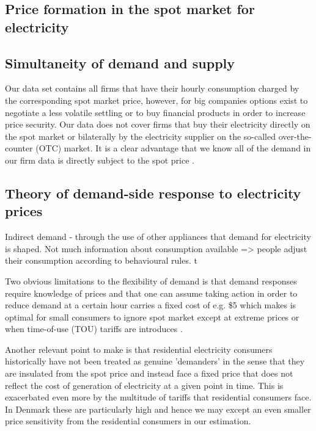 \label{sec:theory}
\subsection{Price formation in the spot market for electricity}
\label{subsec:t_price}


\subsection{Simultaneity of demand and supply}
\label{subsec:t_simultaneity}
Our data set contains all firms that have their hourly consumption charged by the corresponding spot market price, however, for big companies options exist to negotiate a less volatile settling or to buy financial products in order to increase price security. Our data does not cover firms that buy their electricity directly on the spot market or bilaterally by the electricity supplier on the so-called over-the-counter (OTC) market. It is a clear advantage that we know all of the demand in our firm data is directly subject to the spot price \citep{lijesen2007real}.


\subsection{Theory of demand-side response to electricity prices}
\label{subsec:t_demand}
Indirect demand - through the use of other appliances that demand for electricity is shaped. Not much information about consumption available => people adjust their consumption according to behavioural rules. t

Two obvious limitations to the flexibility of demand is that demand responses require knowledge of prices and that one can assume taking action in order to reduce demand at a certain hour carries a fixed cost of e.g. \$5 which makes is optimal for small consumers to ignore spot market except at extreme prices or when time-of-use (TOU) tariffs are introduces \citep{wolak2011residential}. 

Another relevant point to make is that residential electricity consumers historically have not been treated as genuine 'demanders' in the sense that they are insulated from the spot price and instead face a fixed price that does not reflect the cost of generation of electricity at a given point in time. This is exacerbated even more by the multitude of tariffs that residential consumers face.  
In Denmark these are particularly high and hence we may except an even smaller price sensitivity from the residential consumers in our estimation.   

